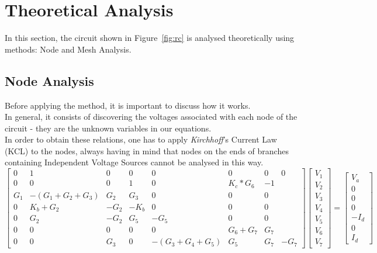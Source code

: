 \section{Theoretical Analysis}
\label{sec:analysis}

In this section, the circuit shown in Figure~\ref{fig:rc} is analysed
theoretically using methods: Node and Mesh Analysis.

\subsection{Node Analysis}

Before applying the method, it is important to discuss how it works.\\
In general, it consists of discovering the voltages associated with each node of the circuit - they are the unknown variables in our equations. \\
In order to obtain these relations, one has to apply \textit{Kirchhoff}'s Current Law (KCL) to the nodes, always having in mind that nodes on the ends of branches containing Independent Voltage Sources cannot be analysed in this way. \\
\[
\begin{bmatrix}
0 & 1 & 0 & 0 & 0 & 0 & 0 & 0 \\
0 & 0 & 0  & 1 & 0 & K_c*G_6 & -1 \\
G_1 & -(G_1+G_2+G_3) & G_2 & G_3 & 0 & 0 & 0  \\
0 & K_b+G_2 & -G_2 & -K_b & 0 & 0 & 0 \\
0 & G_2 & -G_2 & G_5 & -G_5 & 0 & 0 \\
0 & 0 & 0 & 0 & 0 & G_6+G_7 & G_7 \\
0 & 0 & G_3 & 0 & -(G_3+G_4+G_5) & G_5 & G_7 & -G_7
\end{bmatrix}
\begin{bmatrix}
V_1 \\
V_2 \\
V_3 \\
V_4 \\
V_5 \\
V_6 \\
V_7 
\end{bmatrix}
=
\begin{bmatrix}
V_a \\
0 \\
0 \\
0 \\ 
-I_d \\
0 \\
I_d 
\end{bmatrix}
\]


